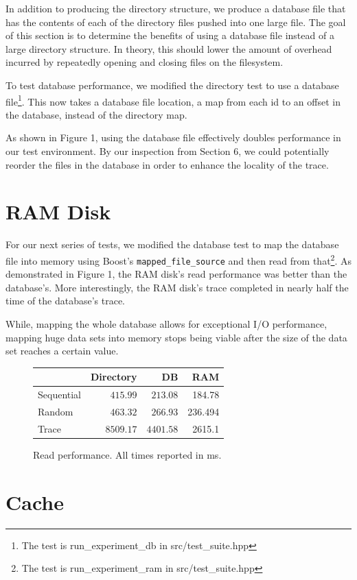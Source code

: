 \documentclass[notitlepage, twocolumn,11pt]{article}
\begin{document}
In addition to producing the directory structure, we produce a database file that has the contents of each of the directory files pushed into one large file.
The goal of this section is to determine the benefits of using a database file instead of a large directory structure.
In theory, this should lower the amount of overhead incurred by repeatedly opening and closing files on the filesystem.

To test database performance, we modified the directory test to use a database file\footnote{The test is run\_experiment\_db in src/test\_suite.hpp}.
This now takes a database file location, a map from each id to an offset in the database, instead of the directory map.

As shown in Figure 1, using the database file effectively doubles performance in our test environment.
By our inspection from Section 6, we could potentially reorder the files in the database in order to enhance the locality of the trace.

\section{RAM Disk}

For our next series of tests, we modified the database test to map the database file into memory using Boost's \verb|mapped_file_source| and then read from that\footnote{The test is run\_experiment\_ram in src/test\_suite.hpp}.
As demonstrated in Figure 1, the RAM disk's read performance was better than the database's.
More interestingly, the RAM disk's trace completed in nearly half the time of the database's trace.

While, mapping the whole database allows for exceptional I/O performance, mapping huge data sets into memory stops being viable after the size of the data set reaches a certain value.

\begin{figure}
\centering
\begin{tabular}{l|r|r|r}
&Directory&DB&RAM\\\hline
Sequential&$415.99$&$213.08$&184.78\\\hline
Random&$463.32$&$266.93$&236.494\\\hline
Trace&$8509.17$&$4401.58$&2615.1
\end{tabular}
\caption{Read performance. All times reported in ms.}
\end{figure}

\section{Cache}
\end{document}
